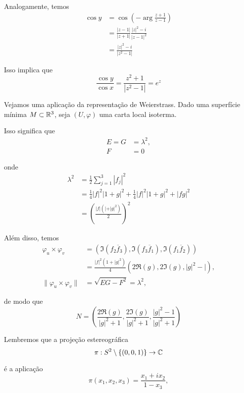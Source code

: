 \begin{exemplo}
	Analogamente, temos
	\begin{align*}
		\cos y &= \cos \left( -\arg \frac{z + 1}{z - 1} \right) \\
		&= \frac{|z - 1|}{|z + 1|} \frac{|z|^2 - i}{|z - 1|^2} \\
		&= \frac{|z|^2 - i}{|z^2 - 1|}
	\end{align*}
	
	Isso implica que
	\begin{equation*}
		\frac{\cos y}{\cos x} = \frac{z^2 + 1}{|z^2 - 1|} = e^z
	\end{equation*}
	
	Vejamos uma aplicação da representação de Weierstrass. Dado uma superfície mínima $M \subset \mathbb{R}^3$, seja $(U, \varphi)$ uma carta local isoterma.
	
	Isso significa que
	\begin{align*}
		E = G &= \lambda^2, \\
		F &= 0
	\end{align*}
	
	onde
	\begin{align*}
		\lambda^2 &= \frac{1}{2} \sum_{j=1}^{3} |f_j|^2 \\
		&= \frac{1}{4} |f|^2 |1 + g|^2 + \frac{1}{4} |f|^2 |1 + g|^2 + |fg|^2\\
		&= \left( \frac{|f| (| + |g|^2)}{2} \right)^2
	\end{align*} 
	
	Além disso, temos
	\begin{align*}
		\varphi_u \times \varphi_v &= \left( \Im (f_2 \overline{f}_3), \Im (f_3 \overline{f}_1), \Im (f_1 \overline{f}_2) \right) \\
		&= \frac{|f|^2 (1 + |g|^2)}{4} \left( 2 \Re(g), 2 \Im(g), |g|^2 - | \right), \\
		\| \varphi_u \times \varphi_v \| &= \sqrt{EG - F^2} = \lambda^2,
	\end{align*}
	
	de modo que
	\begin{equation*}
		N = \left( \frac{2 \Re(g)}{|g|^2 + 1}, \frac{2 \Im(g)}{|g|^2 + 1}, \frac{|g|^2 - 1}{|g|^2 + 1} \right)
	\end{equation*}
	
	Lembremos que a projeção estereográfica
	\begin{equation*}
		\pi: S^2 \setminus \{ (0,0,1) \} \rightarrow \mathbb{C}
	\end{equation*}
	
	é a aplicação
	\begin{equation*}
		\pi(x_1, x_2, x_3) = \frac{x_1 + ix_2}{1 - x_3},
	\end{equation*}
	

\end{exemplo}

